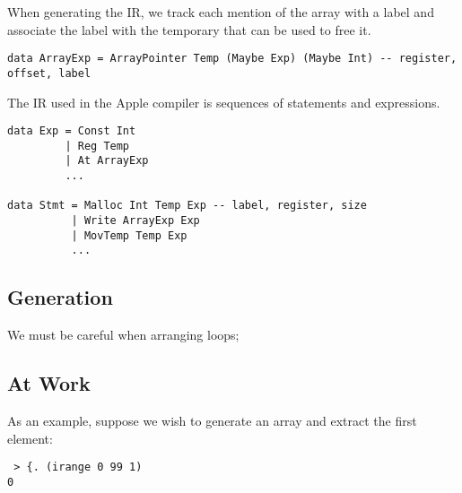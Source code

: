 \documentclass{article}
\begin{document}
When generating the IR, we track each mention of the array with a label and associate the label with the temporary that can be used to free it.

\begin{verbatim}
data ArrayExp = ArrayPointer Temp (Maybe Exp) (Maybe Int) -- register, offset, label
\end{verbatim}




The IR used in the Apple compiler is sequences of statements and expressions.

\begin{verbatim}
data Exp = Const Int
         | Reg Temp
         | At ArrayExp
         ...

data Stmt = Malloc Int Temp Exp -- label, register, size
          | Write ArrayExp Exp
          | MovTemp Temp Exp
          ...
\end{verbatim}

\subsection{Generation}

We must be careful when arranging loops;

\subsection{At Work}

As an example, suppose we wish to generate an array and extract the first element:

\begin{verbatim}
 > {. (irange 0 99 1)
0
\end{verbatim}
\end{document}

